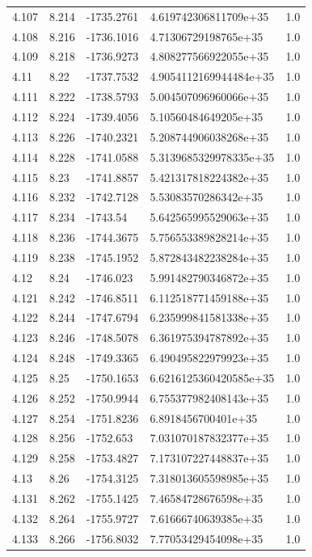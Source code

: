 \begin{tabular}{lllll}
4.107 & 8.214 & -1735.2761 & 4.619742306811709e+35 & 1.0 \\
4.108 & 8.216 & -1736.1016 & 4.71306729198765e+35 & 1.0 \\
4.109 & 8.218 & -1736.9273 & 4.808277566922055e+35 & 1.0 \\
4.11 & 8.22 & -1737.7532 & 4.9054112169944484e+35 & 1.0 \\
4.111 & 8.222 & -1738.5793 & 5.004507096960066e+35 & 1.0 \\
4.112 & 8.224 & -1739.4056 & 5.10560484649205e+35 & 1.0 \\
4.113 & 8.226 & -1740.2321 & 5.208744906038268e+35 & 1.0 \\
4.114 & 8.228 & -1741.0588 & 5.3139685329978335e+35 & 1.0 \\
4.115 & 8.23 & -1741.8857 & 5.421317818224382e+35 & 1.0 \\
4.116 & 8.232 & -1742.7128 & 5.53083570286342e+35 & 1.0 \\
4.117 & 8.234 & -1743.54 & 5.642565995529063e+35 & 1.0 \\
4.118 & 8.236 & -1744.3675 & 5.756553389828214e+35 & 1.0 \\
4.119 & 8.238 & -1745.1952 & 5.872843482238284e+35 & 1.0 \\
4.12 & 8.24 & -1746.023 & 5.991482790346872e+35 & 1.0 \\
4.121 & 8.242 & -1746.8511 & 6.112518771459188e+35 & 1.0 \\
4.122 & 8.244 & -1747.6794 & 6.235999841581338e+35 & 1.0 \\
4.123 & 8.246 & -1748.5078 & 6.361975394787892e+35 & 1.0 \\
4.124 & 8.248 & -1749.3365 & 6.490495822979923e+35 & 1.0 \\
4.125 & 8.25 & -1750.1653 & 6.6216125360420585e+35 & 1.0 \\
4.126 & 8.252 & -1750.9944 & 6.755377982408143e+35 & 1.0 \\
4.127 & 8.254 & -1751.8236 & 6.8918456700401e+35 & 1.0 \\
4.128 & 8.256 & -1752.653 & 7.031070187832377e+35 & 1.0 \\
4.129 & 8.258 & -1753.4827 & 7.173107227448837e+35 & 1.0 \\
4.13 & 8.26 & -1754.3125 & 7.318013605598985e+35 & 1.0 \\
4.131 & 8.262 & -1755.1425 & 7.46584728676598e+35 & 1.0 \\
4.132 & 8.264 & -1755.9727 & 7.61666740639385e+35 & 1.0 \\
4.133 & 8.266 & -1756.8032 & 7.77053429454098e+35 & 1.0 \\

\end{tabular}
